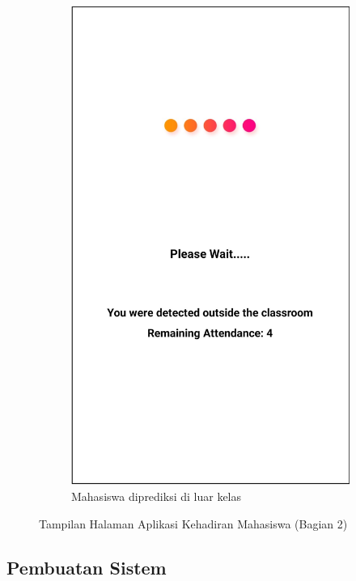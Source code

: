 \begin{enumerate}[a.]
\begin{figure} [H]
\begin{subfigure}{.5\textwidth}
	\end{subfigure}
	\begin{subfigure}{.5\textwidth}
  		\centering
  		\includegraphics[width=.5\linewidth]{gambar/android/mahasiswa-8}  
  		\caption{Mahasiswa diprediksi di luar kelas}
	\end{subfigure}
		\vspace{0.5cm}
		\caption{Tampilan Halaman Aplikasi Kehadiran Mahasiswa (Bagian 2)}
	\label{aplikasimahasiswabagian2}
	\end{figure}

	
		\end{enumerate}
		
	\subsection{Pembuatan Sistem}
	
